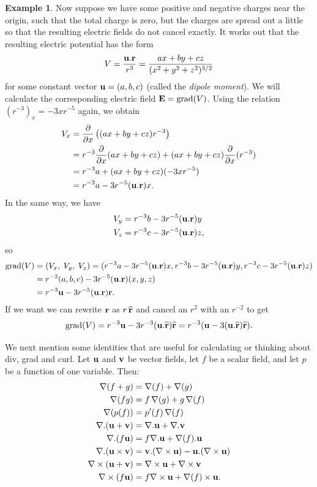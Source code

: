 \documentclass[reqno]{amsart}
\theoremstyle{definition}
\newtheorem{example}[theorem]{Example}
\begin{document}
\begin{example}\label{eg-dipole-rectangular}
 Now suppose we have some positive and negative charges near the origin,
 such that the total charge is zero, but the charges are spread out a
 little so that the resulting electric fields do not cancel exactly.
 It works out that the resulting electric potential has the form
 \[ V = \frac{\mathbf{u}.\mathbf{r}}{r^3} 
      = \frac{ax+by+cz}{(x^2+y^2+z^2)^{3/2}}
 \]
 for some constant vector $\mathbf{u}=(a,b,c)$ (called the \emph{dipole
  moment}).  We will calculate the corresponding electric field
 $\mathbf{E}=\operatorname{grad}(V)$.  Using the relation $(r^{-3})_x=-3xr^{-5}$ again, we
 obtain 
 \begin{align*}
  V_x &= \frac{\partial}{\partial x}\left((ax+by+cz)r^{-3}\right) \\
   &= r^{-3}\frac{\partial}{\partial x}(ax+by+cz) + (ax+by+cz)\frac{\partial}{\partial x}(r^{-3}) \\
   &= r^{-3}a + (ax+by+cz)(-3xr^{-5}) \\
   &= r^{-3}a -3r^{-5}(\mathbf{u}.\mathbf{r})x.
 \end{align*}
 In the same way, we have
 \begin{align*}
  V_y &= r^{-3}b -3r^{-5}(\mathbf{u}.\mathbf{r})y \\
  V_z &= r^{-3}c -3r^{-5}(\mathbf{u}.\mathbf{r})z,
 \end{align*}
 so 
 \begin{align*}
  \operatorname{grad}(V)
    &= (V_x,\;V_y,\;V_z) 
     = (r^{-3}a -3r^{-5}(\mathbf{u}.\mathbf{r})x,
        r^{-3}b -3r^{-5}(\mathbf{u}.\mathbf{r})y,
        r^{-3}c -3r^{-5}(\mathbf{u}.\mathbf{r})z) \\
    &= r^{-3}(a,b,c) - 3r^{-5}(\mathbf{u}.\mathbf{r})(x,y,z) \\
    &= r^{-3}\mathbf{u} - 3r^{-5}(\mathbf{u}.\mathbf{r})\mathbf{r}. 
 \end{align*}
 If we want we can rewrite $\mathbf{r}$ as $r\,\widehat{\mathbf{r}}$ and cancel an $r^2$
 with an $r^{-2}$ to get
 \[ \operatorname{grad}(V) = r^{-3}\mathbf{u} - 3r^{-3}(\mathbf{u}.\widehat{\mathbf{r}})\widehat{\mathbf{r}} 
     = r^{-3}(\mathbf{u} - 3 (\mathbf{u}.\widehat{\mathbf{r}})\widehat{\mathbf{r}}).
 \]
\end{example}

We next mention some identities that are useful for calculating or
thinking about div, grad and curl.  Let $\mathbf{u}$ and $\mathbf{v}$ be vector
fields, let $f$ be a scalar field, and let $p$ be a function of one
variable.  Then:
\begin{align*}
 \nabla(f+g)        &= \nabla(f) + \nabla(g) \\
 \nabla(fg)         &= f\,\nabla(g) + g\,\nabla(f) \\
 \nabla(p(f))       &= p'(f)\,\nabla(f) \\
 \nabla.(\mathbf{u}+\mathbf{v})   &= \nabla.\mathbf{u} + \nabla.\mathbf{v} \\
 \nabla.(f\mathbf{u})      &= f\nabla.\mathbf{u} + \nabla(f).\mathbf{u} \\
 \nabla.(\mathbf{u}\times\mathbf{v}) &= \mathbf{v}.(\nabla\times\mathbf{u}) - \mathbf{u}.(\nabla\times\mathbf{u}) \\
 \nabla\times(\mathbf{u}+\mathbf{v}) &= \nabla\times\mathbf{u} + \nabla\times\mathbf{v} \\
 \nabla\times(f\mathbf{u})    &= f\nabla\times\mathbf{u} + \nabla(f)\times\mathbf{u}.
\end{align*}
\end{document}

